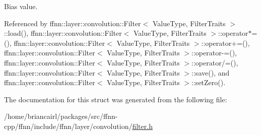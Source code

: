 Bias value. 



Referenced by ffnn\-::layer\-::convolution\-::\-Filter$<$ Value\-Type, Filter\-Traits $>$\-::load(), ffnn\-::layer\-::convolution\-::\-Filter$<$ Value\-Type, Filter\-Traits $>$\-::operator$\ast$=(), ffnn\-::layer\-::convolution\-::\-Filter$<$ Value\-Type, Filter\-Traits $>$\-::operator+=(), ffnn\-::layer\-::convolution\-::\-Filter$<$ Value\-Type, Filter\-Traits $>$\-::operator-\/=(), ffnn\-::layer\-::convolution\-::\-Filter$<$ Value\-Type, Filter\-Traits $>$\-::operator/=(), ffnn\-::layer\-::convolution\-::\-Filter$<$ Value\-Type, Filter\-Traits $>$\-::save(), and ffnn\-::layer\-::convolution\-::\-Filter$<$ Value\-Type, Filter\-Traits $>$\-::set\-Zero().



The documentation for this struct was generated from the following file\-:\begin{DoxyCompactItemize}
\item 
/home/briancairl/packages/src/ffnn-\/cpp/ffnn/include/ffnn/layer/convolution/\hyperlink{filter_8h}{filter.\-h}\end{DoxyCompactItemize}
